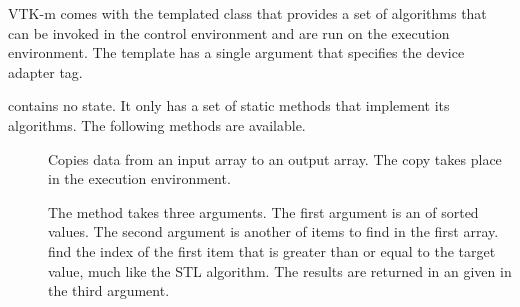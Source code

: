 
VTK-m comes with the templated class  that
provides a set of algorithms that can be invoked in the control environment
and are run on the execution environment. The template has a single
argument that specifies the device adapter tag.


 contains no state. It only has a
set of static methods that implement its algorithms. The following methods
are available.

\begin{description}
\item[]  Copies data from an input array to an
  output array. The copy takes place in the execution environment.
\item[]  The
   method takes three arguments. The first argument
  is an  of sorted values. The second argument
  is another  of items to find in the first
  array.  find the index of the first item that is
  greater than or equal to the target value, much like the
   STL algorithm. The results are returned in
  an  given in the third argument.


\end{description}
